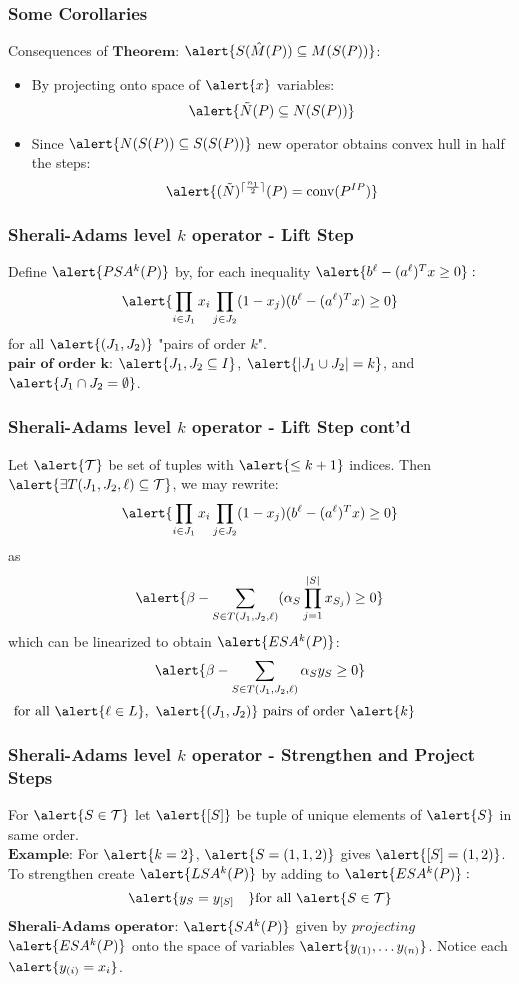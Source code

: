 \documentclass{beamer}
\DeclarePairedDelimiter{\ceil}{\lceil}{\rceil}
\DeclareMathOperator{\conv}{conv}
\begin{document}
\begin{frame}
\frametitle{Some Corollaries}
Consequences of $\textbf{Theorem:}$ $\alert{S(\hat{M}(P)) \subseteq M(S(P))}$:
\begin{itemize}
\item By projecting onto space of $\alert{x}$ variables: $$\alert{\tilde{N}(P) \subseteq N(S(P))}$$
\item Since $\alert{N(S(P)) \subseteq S(S(P))}$ new operator obtains convex hull in half the steps: $$\alert{(\tilde{N})^{\ceil{\frac{n_1}{2}}}(P) = \conv(P^{IP})}$$
\end{itemize}
\end{frame}

\begin{frame}
\frametitle{Sherali-Adams level $k$ operator - Lift Step}
Define $\alert{PSA^k(P)}$ by, for each inequality $\alert{b^\ell - (a^\ell)^Tx \geq 0}:$
$$\alert{\prod_{i \in J_1} x_i \prod_{j \in J_2} (1 - x_j) (b^\ell - (a^\ell)^Tx) \geq 0}$$
for all $\alert{(J_1, J_2)}$ "pairs of order $k$".\\
$\textbf{pair of order k:}$ $\alert{J_1, J_2 \subseteq I}$, $\alert{|J_1 \cup J_2| = k}$, and $\alert{J_1 \cap J_2 = \emptyset}$.
\end{frame}

\begin{frame}
\frametitle{Sherali-Adams level $k$ operator - Lift Step cont'd}
Let $\alert{\mathcal{T}}$ be set of tuples with $\alert{\leq k+1}$ indices. Then $\alert{\exists T(J_1,J_2,\ell) \subseteq \mathcal{T}}$, we may rewrite:
$$\alert{\prod_{i \in J_1} x_i \prod_{j \in J_2} (1 - x_j) (b^\ell - (a^\ell)^Tx) \geq 0}$$
as
$$ \alert{\beta - \sum_{S \in T(J_1, J_2,\ell)} (\alpha_S \prod_{j=1}^{|S|} x_{S_j}) \geq 0}$$
which can be linearized to obtain $\alert{ESA^k(P)}$:
$$\alert{\beta -\sum_{S \in T(J_1, J_2,\ell)} \alpha_S y_S \geq 0} $$
$\text{ for all } \alert{\ell \in L},\ \alert{(J_1, J_2)} \text{ pairs of order } \alert{k}$
\end{frame}

\begin{frame}
\frametitle{Sherali-Adams level $k$ operator - Strengthen and Project Steps}
For $\alert{S \in \mathcal{T}}$ let $\alert{[S]}$ be tuple of unique elements of $\alert{S}$ in same order.\\
$\textbf{Example:}$ For $\alert{k=2}$, $\alert{S = (1,1,2)}$ gives $\alert{[S] = (1,2)}$.\\
To strengthen create $\alert{LSA^k(P)}$ by adding to $\alert{ESA^k(P)}:$
$$\alert{y_S = y_{[S]} \quad} \text{for all } \alert{S \in \mathcal{T}}$$
$\textbf{Sherali-Adams operator:}$ $\alert{SA^k(P)}$ given by $\textit{projecting}$ $\alert{ESA^k(P)}$ onto the space of variables $\alert{y_{(1)} ,\dots y_{(n)}}$. Notice each $\alert{y_{(i)} = x_i}$.
\end{frame}
\end{document}
